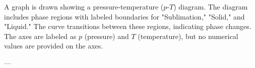 A graph is drawn showing a pressure-temperature (\( p \)-\( T \)) diagram. The diagram includes phase regions with labeled boundaries for "Sublimation," "Solid," and "Liquid." The curve transitions between these regions, indicating phase changes. The axes are labeled as \( p \) (pressure) and \( T \) (temperature), but no numerical values are provided on the axes.

---